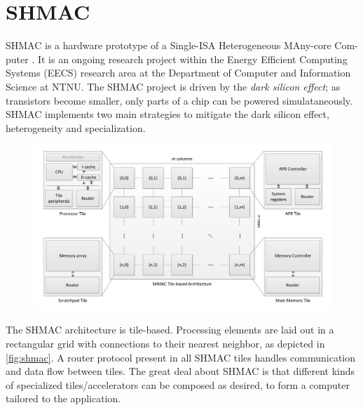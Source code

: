 \section{SHMAC}

SHMAC is a hardware prototype of a Single-ISA Heterogeneous MAny-core Com- puter
\cite{shmacsliedes, shmacwebpage}. It is an ongoing research project within the
Energy Efficient Computing Systems (EECS) research area at the Department of
Computer and Information Science at NTNU. The SHMAC project is driven by the
\textit{dark silicon effect}; as transistors become smaller, only parts of a
chip can be powered simulataneously. SHMAC implements two main strategies to
mitigate the dark silicon effect, heterogeneity and specialization.

\begin{figure}
    \centering
    \includegraphics[width=1.0\textwidth]{figs/shmac-high-level2.png}
    \caption{}
    \label{fig:shmac}
\end{figure}

The SHMAC architecture is tile-based. Processing elements are laid out in a
rectangular grid with connections to their nearest neighbor, as depicted in
\autoref{fig:shmac}. A router protocol present in all SHMAC tiles handles
communication and data flow between tiles.  The great deal about SHMAC is that
different kinds of specialized tiles/accelerators can be composed as desired, to
form a computer tailored to the application.

